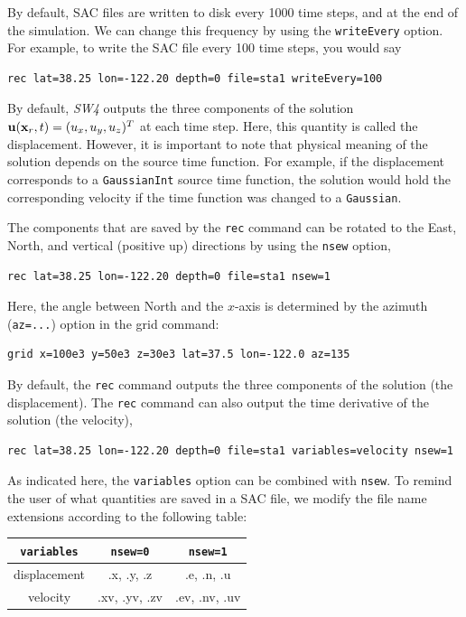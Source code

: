 \documentclass[11pt]{report}
\newcommand{\ub}{{\bf u}}
\newcommand{\xb}{{\bf x}}
\begin{document}
{By default, SAC files are written to disk every 1000 time steps, and at the end of the
simulation. We can change this frequency by using the {\tt writeEvery} option. For example, to
write the SAC file every 100 time steps, you would say
\begin{verbatim}
rec lat=38.25 lon=-122.20 depth=0 file=sta1 writeEvery=100
\end{verbatim}


By default, \emph{SW4} outputs the three components of the solution $\ub(\xb_r,t)=(u_x,u_y,u_z)^T$
at each time step. Here, this quantity is called the displacement. However, it is
important to note that physical meaning of the solution depends on the source time function. For
example, if the displacement corresponds to a \verb+GaussianInt+ source time function, the solution
would hold the corresponding velocity if the time function was changed to a \verb+Gaussian+.

The components that are saved by the \verb+rec+ command can be rotated to the East, North, and vertical
(positive up) directions by using the \verb+nsew+ option,
\begin{verbatim}
rec lat=38.25 lon=-122.20 depth=0 file=sta1 nsew=1
\end{verbatim}
Here, the angle between North and the $x$-axis is determined by the azimuth ({\tt az=...}) option in
the grid command:
\begin{verbatim}
grid x=100e3 y=50e3 z=30e3 lat=37.5 lon=-122.0 az=135
\end{verbatim}
By default, the \verb+rec+ command outputs the three components of the solution (the displacement). The
\verb+rec+ command can also output the time derivative of the solution (the velocity),
\begin{verbatim}
rec lat=38.25 lon=-122.20 depth=0 file=sta1 variables=velocity nsew=1
\end{verbatim}
As indicated here, the \verb+variables+ option can be combined with \verb+nsew+.  To remind the user
of what quantities are saved in a SAC file, we modify the file name extensions according to the
following table:
\begin{center}
	\begin{tabular}{|c|c|c|} \hline
		\verb+variables+ & \verb+nsew=0+ & \verb+nsew=1+ \\ \hline\hline
		displacement     & .x, .y, .z    & .e, .n, .u    \\ \hline
		velocity         & .xv, .yv, .zv & .ev, .nv, .uv \\ \hline
	\end{tabular}
\end{center}

}
\end{document}

